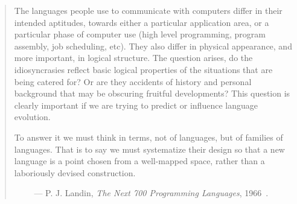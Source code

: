 
\begin{quote}
The languages people use to communicate with computers
differ in their intended aptitudes, towards either a particular
application area, or a particular phase of computer use
(high level programming, program assembly, job scheduling,
etc). They also differ in physical appearance, and more
important, in logical structure. The question arises, do the
idiosyncrasies reflect basic logical properties of the situations
that are being catered for? Or are they accidents of history
and personal background that may be obscuring fruitful
developments? This question is clearly important if we are
trying to predict or influence language evolution.

To answer it we must think in terms, not of languages,
but of families of languages. That is to say we must systematize
their design so that a new language is a point chosen
from a well-mapped space, rather than a laboriously devised
construction.

$\qquad$ --- P. J. Landin, {\em The Next 700 Programming Languages}, 
1966~\cite{landin:700}.
\end{quote}

